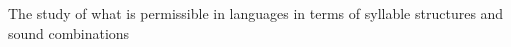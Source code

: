 The study of what is permissible in languages in terms of syllable structures and sound combinations
